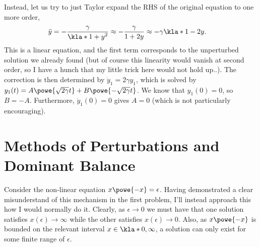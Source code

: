 \documentclass[english, parskip=full]{scrartcl}
\begin{document}
Instead, let us try to just Taylor expand the RHS of the original equation to one more order,
\begin{align}
\ddot{y} &= -\frac{\gamma}{\kla*{1+y}^2} \approx -\frac{\gamma}{1 + 2y} \approx -\gamma \kla*{1 - 2y}.
\end{align}
This is a linear equation, and the first term corresponds to the unperturbed solution we already found (but of course this linearity would vanish at second order, so I have a hunch that my little trick here would not hold up..).
The correction is then determined by $\ddot{y}_1 = 2\gamma y_1$, which is solved by $y_1(t) = A\powe{\sqrt{2\gamma} t} + B\powe{-\sqrt{2\gamma}t}$.
We know that $y_1(0)=0$, so $B=-A$.
Furthermore, $\dot{y}_1(0) = 0$ gives $A=0$ (which is not particularly encouraging).

\section{Methods of Perturbations and Dominant Balance}
Consider the non-linear equation $x\powe{-x} = \epsilon$.
Having demonstrated a clear misunderstand of this mechanism in the first problem, I'll instead approach this how I would normally do it.
Clearly, as $\epsilon\rightarrow 0$ we must have that one solution satisfies $x(\epsilon) \rightarrow \infty$ while the other satisfies $x(\epsilon) \rightarrow 0$.
Also, as $x\powe{-x}$ is bounded on the relevant interval $x\in\kla*{0,\infty}$, a solution can only exist for some finite range of $\epsilon$.
\end{document}
